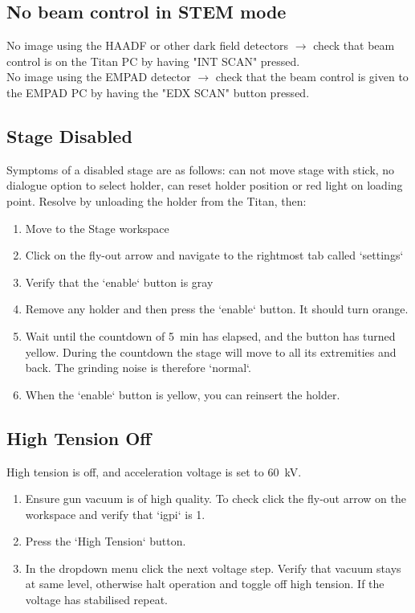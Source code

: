 \documentclass[a4paper]{scrartcl}
\begin{document}
\subsection*{No beam control in STEM mode}
No image using the HAADF or other dark field detectors $\rightarrow$ check that beam control is on the Titan PC by having "INT SCAN" pressed.\\
No image using the EMPAD detector $\rightarrow$ check that the beam control is given to the EMPAD PC by having the "EDX SCAN" button pressed.\\

\subsection*{Stage Disabled}
Symptoms of a disabled stage are as follows: can not move stage with stick, no dialogue option to select holder, can reset holder position or red light on loading point.
Resolve by unloading the holder from the Titan, then:
\begin{enumerate}
	\item Move to the Stage workspace
	\item Click on the fly-out arrow and navigate to the rightmost tab called `settings`
	\item Verify that the `enable` button is gray
	\item Remove any holder and then press the `enable` button. It should turn orange.
	\item Wait until the countdown of \SI{5}{\minute} has elapsed, and the button has turned yellow. During the countdown the stage will move to all its extremities and back. The grinding noise is therefore `normal`.
	\item When the `enable` button is yellow, you can reinsert the holder.
\end{enumerate}

\subsection*{High Tension Off}
High tension is off, and acceleration voltage is set to \SI{60}{\kilo \volt}.
\begin{enumerate}
	\item Ensure gun vacuum is of high quality. To check click the fly-out arrow on the workspace and verify that `igpi` is \SI{1}{\log}.
	\item Press the `High Tension` button.
	\item In the dropdown menu click the next voltage step. Verify that vacuum stays at same level, otherwise halt operation and toggle off high tension. If the voltage has stabilised repeat.
\end{enumerate}
\end{document}

